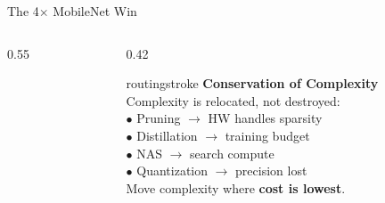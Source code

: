 \documentclass[aspectratio=169, 12pt]{beamer}
\begin{document}
\begin{frame}{The 4$\times$ MobileNet Win}
\begin{columns}[T]
\begin{column}{0.55\textwidth}
    \vspace{0.1cm}
  \end{column}
  \begin{column}{0.42\textwidth}
    \begin{mlsyscard}{routingstroke}
    {\scriptsize \textbf{Conservation of Complexity}\\[0.05cm]
    Complexity is relocated, not destroyed:\\
    $\bullet$ Pruning $\to$ HW handles sparsity\\
    $\bullet$ Distillation $\to$ training budget\\
    $\bullet$ NAS $\to$ search compute\\
    $\bullet$ Quantization $\to$ precision lost\\[0.05cm]
    Move complexity where \textbf{cost is lowest}.}
    \end{mlsyscard}
  \end{column}
\end{columns}

\end{frame}
\end{document}
